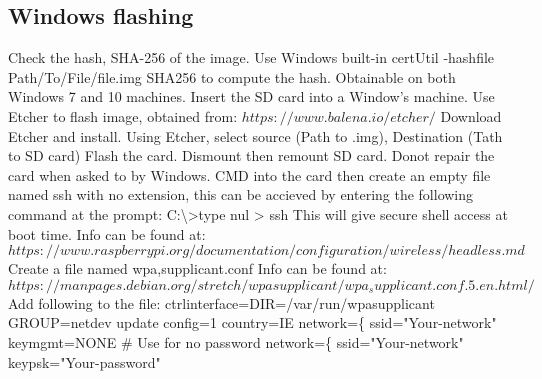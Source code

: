 \documentclass[a4paper,12pt]{article}
\begin{document}
\subsection{Windows flashing}
Check the hash, SHA-256 of the image.
\newline
Use Windows built-in certUtil -hashfile Path/To/File/file.img SHA256 to compute the hash. Obtainable on both Windows 7 and 10 machines.
\newline
Insert the SD card into a Window's machine.
\newline
Use Etcher to flash image, obtained from:
\newline
$https://www.balena.io/etcher/$
\newline
Download Etcher and install.
\newline
Using Etcher, select source (Path to  .img), Destination (Tath to SD card)
Flash the card.
\newline
Dismount then remount SD card.
Donot repair the card when asked to by Windows.
\newline
CMD into the card then create an empty file named ssh with no extension, this can be accieved by entering the following command at the prompt:
\newline
C:\textbackslash \textgreater  type nul > ssh
\newline
This will give secure shell access at boot time.
\newline
Info can be found at:
\newline
$https://www.raspberrypi.org/documentation/configuration/wireless/headless.md
$
\newline
\newline
Create a file named wpa\textunderscore,supplicant.conf
\newline
Info can be found at:
\newline
$https://manpages.debian.org/stretch/wpasupplicant/wpa_supplicant.conf.5.en.html/
$
\newline
\newline
Add following to the file:
\newline
\newline
ctrl\textunderscore interface=DIR=/var/run/wpa\textunderscore supplicant GROUP=netdev
\newline
update\textunderscore
config=1
\newline
country=IE
\newline\newline
network=\{
\newline
\hspace*{10mm}ssid="Your-network"
\newline
\hspace*{10mm}key\textunderscore mgmt=NONE \# Use for no password
\newline\newline
network=\{
\newline
\hspace*{10mm}ssid="Your-network"
\newline
\hspace*{10mm}key\textunderscore psk="Your-password"
\end{document}
